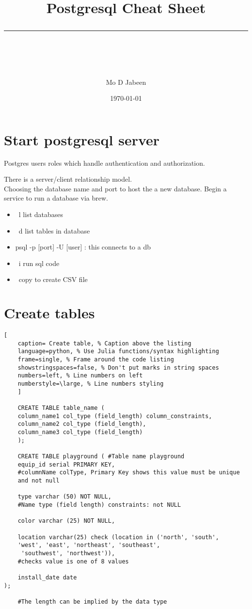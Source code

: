 \documentclass[11pt]{scrartcl} %
\title{	
	\normalfont\normalsize
	\vspace{20pt} %
	{\huge Postgresql Cheat Sheet}\\ %
	\vspace{12pt} %
	\rule{\linewidth}{2pt}\\ %
}
\author{\small Mo D Jabeen} %
\date{\normalsize\today} %
\begin{document}
\maketitle %

\section{Start postgresql server}

Postgres users roles which handle authentication and authorization.

There is a server/client relationship model.\\

Choosing the database name and port to host the a new database. Begin a service to run
a database via brew.

\begin{itemize}
	\item \ l list databases
	\item \ d list tables in database
	\item psql -p [port] -U [user] : this connects to a db
	\item \ i run sql code
	\item \ copy to create CSV file
\end{itemize}

\section{Create tables}

\begin{lstlisting}[
	caption= Create table, % Caption above the listing
	language=python, % Use Julia functions/syntax highlighting
	frame=single, % Frame around the code listing
	showstringspaces=false, % Don't put marks in string spaces
	numbers=left, % Line numbers on left
	numberstyle=\large, % Line numbers styling
	]

	CREATE TABLE table_name (
    column_name1 col_type (field_length) column_constraints,
    column_name2 col_type (field_length),
    column_name3 col_type (field_length)
	);

	CREATE TABLE playground ( #Table name playground
    equip_id serial PRIMARY KEY, 
	#columnName colType, Primary Key shows this value must be unique
	and not null
    
	type varchar (50) NOT NULL, 
	#Name type (field length) constraints: not NULL
 
	color varchar (25) NOT NULL,
 
	location varchar(25) check (location in ('north', 'south', 
	'west', 'east', 'northeast', 'southeast',
	 'southwest', 'northwest')),
	#checks value is one of 8 values
 
	install_date date
);

	#The length can be implied by the data type

\end{lstlisting}
\end{document}
